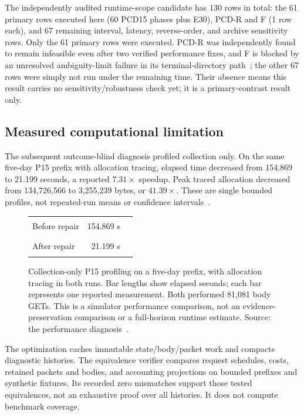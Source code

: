\documentclass[11pt]{article}
\begin{document}
The independently audited runtime-scope candidate has 130 rows in total: the 61 primary rows executed here (60 PCD15 phases plus E30), PCD-R and F (1 row each), and 67 remaining interval, latency, reverse-order, and archive sensitivity rows. Only the 61 primary rows were executed. PCD-R was independently found to remain infeasible even after two verified performance fixes, and F is blocked by an unresolved ambiguity-limit failure in its terminal-directory path~\cite{runtime}; the other 67 rows were simply not run under the remaining time. Their absence means this result carries no sensitivity/robustness check yet; it is a primary-contrast result only.

\subsection{Measured computational limitation}
The subsequent outcome-blind diagnosis profiled collection only. On the same five-day P15 prefix with allocation tracing, elapsed time decreased from 154.869 to 21.199 seconds, a reported $7.31\times$ speedup. Peak traced allocation decreased from 134,726,566 to 3,255,239 bytes, or $41.39\times$. These are single bounded profiles, not repeated-run means or confidence intervals~\cite{performance}.

\begin{figure}[ht]
\centering
\begin{tabular}{lr@{\quad}l}
Before repair & 154.869 s & \textcolor{gray}{\rule{0.46\linewidth}{10pt}}\\[6pt]
After repair & 21.199 s & \textcolor{blue!60!black}{\rule{0.063\linewidth}{10pt}}
\end{tabular}
\caption{Collection-only P15 profiling on a five-day prefix, with allocation tracing in both runs. Bar lengths show elapsed seconds; each bar represents one reported measurement. Both performed 81,081 body GETs. This is a simulator performance comparison, not an evidence-preservation comparison or a full-horizon runtime estimate. Source: the performance diagnosis~\cite{performance}.}
\label{fig:runtime}
\end{figure}

The optimization caches immutable state/body/packet work and compacts diagnostic histories. The equivalence verifier compares request schedules, costs, retained packets and bodies, and accounting projections on bounded prefixes and synthetic fixtures. Its recorded zero mismatches support those tested equivalences, not an exhaustive proof over all histories. It does not compute benchmark coverage.
\end{document}
